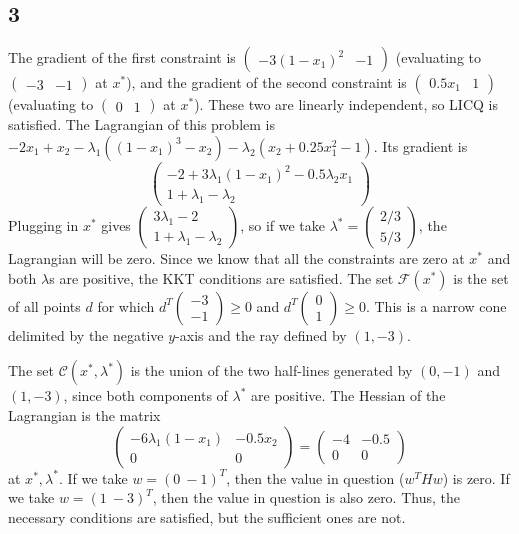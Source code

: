 \documentclass{article}
\newcommand{\openm}{\begin{pmatrix}}
\newcommand{\closem}{\end{pmatrix}}
\begin{document}
\subsection*{3}
The gradient of the first constraint is $\openm-3(1-x_1)^2&-1\closem$ (evaluating to $\openm -3&-1\closem$ at $x^*$), and the gradient of the second constraint is $\openm0.5x_1&1\closem$ (evaluating to $\openm 0&1\closem$ at $x^*$). These two are linearly independent, so LICQ is satisfied.
The Lagrangian of this problem is $-2x_1+x_2-\lambda_1((1-x_1)^3-x_2)-\lambda_2(x_2+0.25x_1^2-1)$. Its gradient is
\[\openm-2+3\lambda_1(1-x_1)^2-0.5\lambda_2x_1\\1+\lambda_1-\lambda_2\closem\]
Plugging in $x^*$ gives $\openm 3\lambda_1-2\\1+\lambda_1-\lambda_2\closem$, so if we take $\lambda^*=\openm2/3\\5/3\closem$, the Lagrangian will be zero. Since we know that all the constraints are zero at $x^*$ and both $\lambda$s are positive, the KKT conditions are satisfied.
The set $\mathscr{F}(x^*)$ is the set of all points $d$ for which $d^T\openm-3\\-1\closem\geq0$ and $d^T\openm0\\1\closem\geq0$. This is a narrow cone delimited by the negative $y$-axis and the ray defined by $(1,-3)$. 

The set $\mathscr{C}(x^*, \lambda^*)$ is the union of the two half-lines generated by $(0, -1)$ and $(1, -3)$, since both components of $\lambda^*$ are positive.
The Hessian of the Lagrangian is the matrix
\[\openm -6\lambda_1(1-x_1)&-0.5x_2\\0&0\closem=\openm-4&-0.5\\0&0\closem\]
at $x^*, \lambda^*$. 
If we take $w=(0\ -1)^T$, then the value in question ($w^THw$) is zero. If we take $w=(1\ -3)^T$, then the value in question is also zero. Thus, the necessary conditions are satisfied, but the sufficient ones are not.
\end{document}
